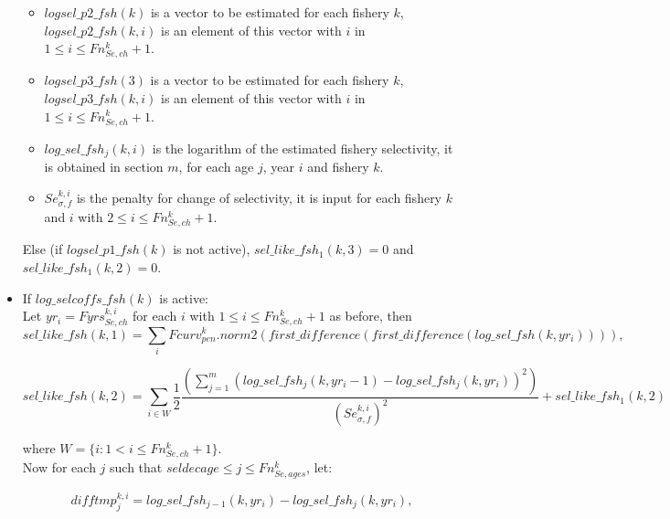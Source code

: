 \documentclass{article}
\begin{document}
\begin{itemize}
\begin{itemize}
    \item $logsel\_p2\_fsh(k)$ is a vector to be estimated for each fishery $k$, $logsel\_p2\_fsh(k,i)$ is an element of this vector with $i$ in $1\leq i \leq Fn_{Se,ch}^k+1$. 
    
    \item $logsel\_p3\_fsh(3)$ is a vector to be estimated for each fishery $k$, $logsel\_p3\_fsh(k,i)$ is an element of this vector with $i$ in $1\leq i \leq Fn_{Se,ch}^k+1$.
    
    \item $log\_sel\_fsh_j(k,i)$ is the logarithm of the estimated fishery selectivity, it is obtained in section $m$, for each age $j$, year $i$ and fishery $k$.
    
    \item $Se_{\sigma,f}^{k,i}$ is the penalty for change of selectivity, it is input for each fishery $k$ and $i$ with  $2\leq i \leq Fn_{Se,ch}^k+1$.
    
\end{itemize}
Else (if $logsel\_p1\_fsh(k)$ is not active), $sel\_like\_fsh_1(k,3)=0$ and $sel\_like\_fsh_1(k,2)=0$.
 
\item If $log\_selcoffs\_fsh(k)$ is active:\\

Let $yr_i = Fyrs_{Se,ch}^{k,i}$ for each $i$ with $1\leq i \leq Fn_{Se,ch}^k+1$ as before, then 
\begin{equation}
    sel\_like\_fsh(k,1) = \sum_{i}Fcurv_{pen}^k .norm2(first\_difference(first\_difference(log\_sel\_fsh(k,yr_i)))),
\end{equation}

\begin{equation}
    sel\_like\_fsh(k,2) = \sum_{i\in W}\dfrac{1}{2} \dfrac{\left(\sum_{j=1}^m(log\_sel\_fsh_j(k,yr_i-1)-log\_sel\_fsh_j(k,yr_i))^2\right)}{(Se_{\sigma,f}^{k,i})^2} + sel\_like\_fsh_1(k,2) 
\end{equation}

where $W=\{i : 1 < i \leq Fn_{Se,ch}^k+1\}$.\\

Now for each $j$ such that $seldecage \leq j \leq Fn_{Se,ages}^k$, let:

\begin{equation}
    difftmp_j^{k,i}=log\_sel\_fsh_{j-1}(k,yr_i)-log\_sel\_fsh_j(k,yr_i), 
\end{equation}


\end{itemize}
\end{document}
